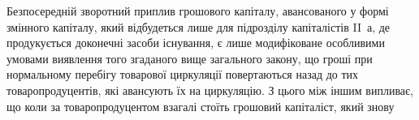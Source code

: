 Безпосередній зворотний приплив грошового капіталу, авансованого у
формі змінного капіталу, який відбудеться лише для підрозділу капіталістів
II~$а$, де продукується доконечні засоби існування, є лише модифіковане
особливими умовами виявлення того згаданого вище
загального закону, що гроші при нормальному перебігу товарової
циркуляції повертаються назад до тих товаропродуцентів, які авансують
їх на циркуляцію. З цього між іншим випливає, що коли за
товаропродуцентом взагалі стоїть грошовий капіталіст, який знову
\parbreak{}  %
